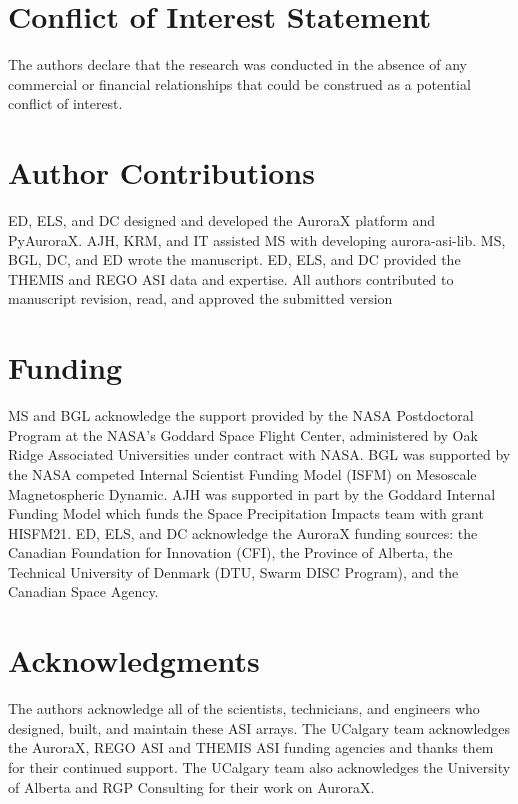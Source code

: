 \documentclass[utf8]{FrontiersinHarvard} %
\begin{document}
\section*{Conflict of Interest Statement}
The authors declare that the research was conducted in the absence of any commercial or financial relationships that could be construed as a potential conflict of interest.

\section*{Author Contributions}
ED, ELS, and DC designed and developed the AuroraX platform and PyAuroraX. AJH, KRM, and IT assisted MS with developing aurora-asi-lib. MS, BGL, DC, and ED wrote the manuscript. ED, ELS, and DC provided the THEMIS and REGO ASI data and expertise.  All authors contributed to manuscript revision, read, and approved the submitted version

\section*{Funding}
MS and BGL acknowledge the support provided by the NASA Postdoctoral Program at the NASA's Goddard Space Flight Center, administered by Oak Ridge Associated Universities under contract with NASA. BGL was supported by the NASA competed Internal Scientist Funding Model (ISFM) on Mesoscale Magnetospheric Dynamic. AJH was supported in part by the Goddard Internal Funding Model which funds the Space Precipitation Impacts team with grant HISFM21. ED, ELS, and DC acknowledge the AuroraX funding sources: the Canadian Foundation for Innovation (CFI), the Province of Alberta, the Technical University of Denmark (DTU, Swarm DISC Program), and the Canadian Space Agency.

\section*{Acknowledgments}
The authors acknowledge all of the scientists, technicians, and engineers who designed, built, and maintain these ASI arrays. The UCalgary team acknowledges the AuroraX, REGO ASI and THEMIS ASI funding agencies and thanks them for their continued support. The UCalgary team also acknowledges the University of Alberta and RGP Consulting for their work on AuroraX. 
\end{document}
